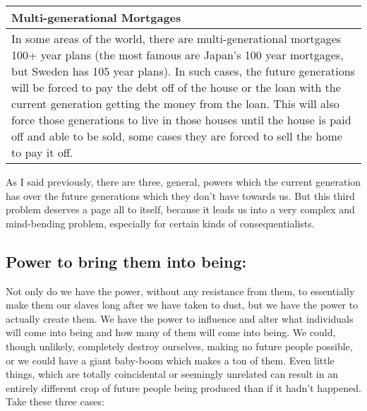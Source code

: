 \begin{tabular}{p{4in}}
Multi-generational Mortgages\\\hline
In some areas of the world, there are multi-generational mortgages 100+ year plans (the most famous are Japan’s 100 year mortgages, but Sweden has 105 year plans). In such cases, the future generations will be forced to pay the debt off of the house or the loan with the current generation getting the money from the loan. This will also force those generations to live in those houses until the house is paid off and able to be sold, some cases they are forced to sell the home to pay it off.
\end{tabular}
As I said previously, there are three, general, powers which the current generation has over the future generations which they don't have towards us. But this third problem deserves a page all to itself, because it leads us into a very complex and mind-bending problem, especially for certain kinds of consequentialists.

\subsection{Power to bring them into being:}

Not only do we have the power, without any resistance from them, to essentially make them our slaves long after we have taken to dust, but we have the power to actually create them. We have the power to influence and alter what individuals will come into being and how many of them will come into being. We could, though unlikely, completely destroy ourselves, making no future people possible, or we could have a giant baby-boom which makes a ton of them. Even little things, which are totally coincidental or seemingly unrelated can result in an entirely different crop of future people being produced than if it hadn't happened. Take these three cases:
	
	
